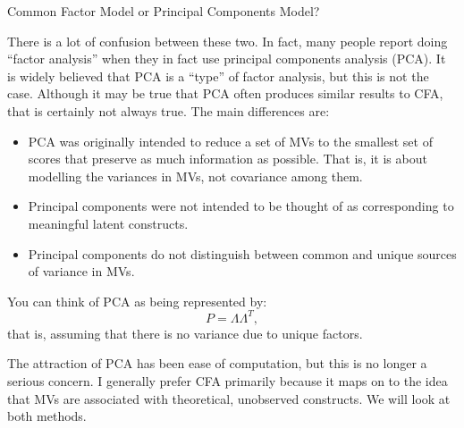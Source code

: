 \documentclass[10pt,ignorenonframetext,]{beamer}
\providecommand{\tightlist}{%
\setlength{\itemsep}{0pt}\setlength{\parskip}{0pt}}
\begin{document}
\begin{frame}{Common Factor Model or Principal Components Model?}

\small
There is a lot of confusion between these two. In fact, many people
report doing ``factor analysis'' when they in fact use principal
components analysis (PCA). It is widely believed that PCA is a ``type''
of factor analysis, but this is not the case. Although it may be true
that PCA often produces similar results to CFA, that is certainly not
always true. The main differences are:

\begin{itemize}
\tightlist
\item
  PCA was originally intended to reduce a set of MVs to the smallest set
  of scores that preserve as much information as possible. That is, it
  is about modelling the variances in MVs, not covariance among them.
\item
  Principal components were not intended to be thought of as
  corresponding to meaningful latent constructs.
\item
  Principal components do not distinguish between common and unique
  sources of variance in MVs.
\end{itemize}

You can think of PCA as being represented by: \[
P = \Lambda\Lambda^T, 
\] that is, assuming that there is no variance due to unique factors.

The attraction of PCA has been ease of computation, but this is no
longer a serious concern. I generally prefer CFA primarily because it
maps on to the idea that MVs are associated with theoretical, unobserved
constructs. We will look at both methods.

\end{frame}
\end{document}
